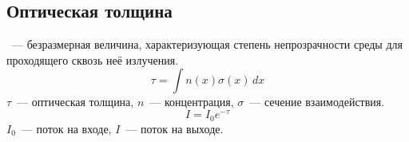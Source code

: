 \subsection{Оптическая толщина}
~--- безразмерная величина, характеризующая степень непрозрачности среды для проходящего сквозь неё излучения.
\begin{equation}
\tau = \int n(x) \sigma(x)\,dx
\end{equation}
$\tau$~--- оптическая толщина, $n$~--- концентрация, $\sigma$~--- сечение взаимодействия.
\begin{equation}
I = I_0 e^{-\tau}
\end{equation}
$I_0$~--- поток на входе, $I$~--- поток на выходе.
